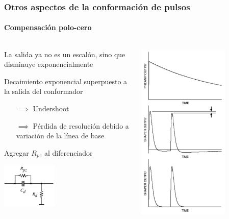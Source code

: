 \documentclass{beamer}
\begin{document}
\begin{frame}
\frametitle{Otros aspectos de la conformación de pulsos}
\framesubtitle{Compensación polo-cero}
\begin{columns}
\begin{column}{0.6\textwidth}
La salida ya no es un escalón, sino que disminuye exponencialmente

Decaimiento exponencial superpuesto a la salida del conformador
\begin{itemize}
\item[$\implies$] Undershoot
\item[$\implies$] Pérdida de resolución debido a variación de la línea de base
\end{itemize}
Agregar $R_{pz}$ al diferenciador
\begin{center}
\includegraphics[width=0.4\textwidth]{d2/rpz_added}
\end{center}
\end{column}
\begin{column}{0.4\textwidth}
\begin{center}
\includegraphics[width=0.7\textwidth]{d2/pz_graphs}

\end{center}
\end{column}
\end{columns}
\end{frame}
\end{document}
